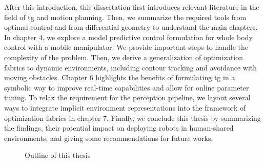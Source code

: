 After this introduction, this dissertation first introduces
relevant literature in the field of \ac{tg}
and motion planning. Then, we summarize the required tools
from optimal control and from differential geometry to
understand the main chapters. In chapter 4, we explore a
model predictive control formulation for whole body control
with a mobile manipulator. We provide important steps to
handle the complexity of the problem. Then, we derive a
generalization of optimization fabrics to dynamic
environments, including contour tracking and avoidance with
moving obstacles. Chapter 6 highlights the benefits of
formulating \ac{tg} in a symbolic way to
improve real-time capabilities and allow for online
parameter tuning. To relax the requirement for the
perception pipeline, we layout several ways to integrate
implicit environment representations into the framework of
optimization fabrics in chapter 7. Finally, we conclude this
thesis by summarizing the findings, their potential impact
on deploying robots in human-shared environments, and giving some
recommendations for future works.

\begin{figure}
  \begin{center}
    
  \end{center}
  \caption{Outline of this thesis}
  \label{fig:outline}
\end{figure}

